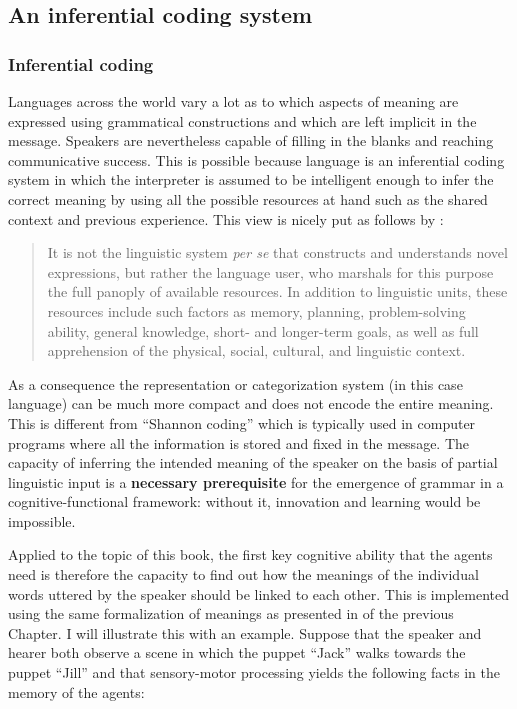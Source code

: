 \subsection{An inferential coding system}
\subsubsection{Inferential coding} 
Languages across the world vary a lot as to which aspects of meaning are expressed using grammatical constructions and which are left implicit in the message. Speakers are nevertheless capable of filling in the blanks and reaching communicative success. This is possible because language is an inferential coding system \citep{sperber86relevance} in which the interpreter is assumed to be intelligent enough to infer the correct meaning by using all the possible resources at hand such as the shared context and previous experience. This view is nicely put as follows by \citet[9]{langacker00dynamic}:

\begin{quote}
It is not the linguistic system {\em per se} that constructs and understands novel expressions, but rather the language user, who marshals for this purpose the full panoply of available resources. In addition to linguistic units, these resources include such factors as memory, planning, problem-solving ability, general knowledge, short- and longer-term goals, as well as full apprehension of the physical, social, cultural, and linguistic context.
\end{quote}

As a consequence the representation or categorization system (in this case language) can be much more compact and does not encode the entire meaning. This is different from ``Shannon coding'' which is typically used in computer programs where all the information is stored and fixed in the message. The capacity of inferring the intended meaning of the speaker on the basis of partial linguistic input is a {\bfseries necessary prerequisite} for the emergence of grammar in a cognitive-functional framework: without it, innovation and learning would be impossible.

Applied to the topic of this book, the first key cognitive ability that the agents need is therefore the capacity to find out how the meanings of the individual words uttered by the speaker should be linked to each other. This is implemented using the same formalization of meanings as presented in  of the previous Chapter. I will illustrate this with an example. Suppose that the speaker and hearer both observe a scene in which the puppet ``Jack'' walks towards the puppet ``Jill'' and that sensory-motor processing yields the following facts in the memory of the agents:

